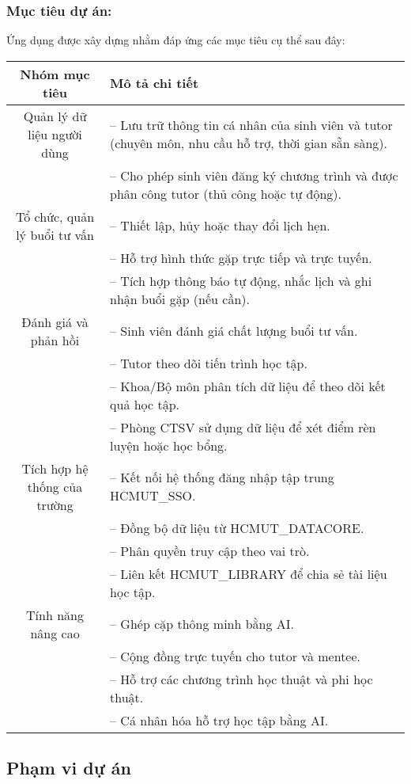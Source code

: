 \newpage

\subsubsection{Mục tiêu dự án:}
Ứng dụng được xây dựng nhằm đáp ứng các mục tiêu cụ thể sau đây:
\renewcommand{\arraystretch}{1.4} %
\begin{table}[H]
\centering
\begin{tabular}{|c|p{9.5cm}|}
\hline
\textbf{Nhóm mục tiêu} & \textbf{Mô tả chi tiết} \\
\hline
Quản lý dữ liệu người dùng &
-- Lưu trữ thông tin cá nhân của sinh viên và tutor (chuyên môn, nhu cầu hỗ trợ, thời gian sẵn sàng).\\
& -- Cho phép sinh viên đăng ký chương trình và được phân công tutor (thủ công hoặc tự động). \\
\hline
Tổ chức, quản lý buổi tư vấn &
-- Thiết lập, hủy hoặc thay đổi lịch hẹn.\\
& -- Hỗ trợ hình thức gặp trực tiếp và trực tuyến.\\
& -- Tích hợp thông báo tự động, nhắc lịch và ghi nhận buổi gặp (nếu cần). \\
\hline
Đánh giá và phản hồi &
-- Sinh viên đánh giá chất lượng buổi tư vấn.\\
& -- Tutor theo dõi tiến trình học tập.\\
& -- Khoa/Bộ môn phân tích dữ liệu để theo dõi kết quả học tập.\\
& -- Phòng CTSV sử dụng dữ liệu để xét điểm rèn luyện hoặc học bổng. \\
\hline
Tích hợp hệ thống của trường &
-- Kết nối hệ thống đăng nhập tập trung HCMUT\_SSO.\\
& -- Đồng bộ dữ liệu từ HCMUT\_DATACORE.\\
& -- Phân quyền truy cập theo vai trò.\\
& -- Liên kết HCMUT\_LIBRARY để chia sẻ tài liệu học tập. \\
\hline
Tính năng nâng cao &
-- Ghép cặp thông minh bằng AI.\\
& -- Cộng đồng trực tuyến cho tutor và mentee.\\
& -- Hỗ trợ các chương trình học thuật và phi học thuật.\\
& -- Cá nhân hóa hỗ trợ học tập bằng AI. \\
\hline
\end{tabular}
\end{table}

\subsection{Phạm vi dự án}

